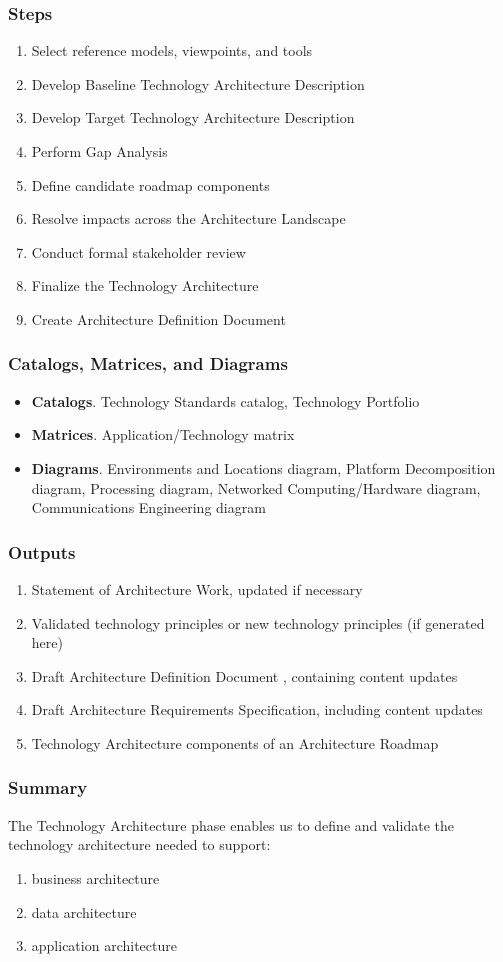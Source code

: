 \documentclass[aspectratio=169, table]{beamer}
\begin{document}
\begin{frame}
\frametitle{Steps}
\vspace{20pt}
\begin{enumerate}
	\item Select reference models, viewpoints, and tools
	\item Develop Baseline Technology Architecture Description
	\item Develop Target Technology Architecture Description
	\item Perform Gap Analysis
	\item Define candidate roadmap components
	\item Resolve impacts across the Architecture Landscape
	\item Conduct formal stakeholder review
	\item Finalize the Technology Architecture
	\item Create Architecture Definition Document
\end{enumerate}
\end{frame}

\begin{frame}
\frametitle{Catalogs, Matrices, and Diagrams}
\begin{itemize}
\item \textbf{Catalogs}. Technology Standards catalog, Technology Portfolio
\item \textbf{Matrices}. Application/Technology matrix
\item \textbf{Diagrams}. Environments and Locations diagram, Platform Decomposition diagram, Processing diagram, Networked Computing/Hardware diagram, Communications Engineering diagram
\end{itemize}
\end{frame}

\begin{frame}
	\frametitle{Outputs}
	\begin{enumerate}
		\item Statement of Architecture Work, updated if necessary
		\item Validated technology principles or new technology principles (if generated here)
		\item Draft Architecture Definition Document , containing content updates 
		\item Draft Architecture Requirements Specification, including content updates
		\item Technology Architecture components of an Architecture Roadmap
	\end{enumerate}
\end{frame}

\begin{frame}
\frametitle{Summary}
The Technology Architecture phase enables us to define and validate the technology architecture needed to support:
\begin{enumerate}
	\item business architecture
	\item data architecture
	\item application architecture
\end{enumerate}
\end{frame}
\end{document}
